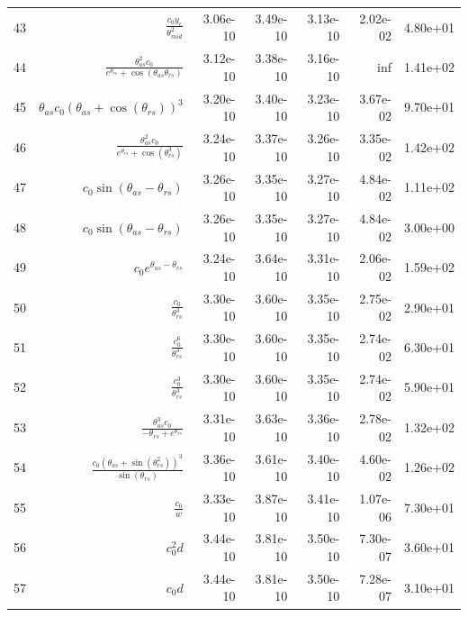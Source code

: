 \begin{tabularx}{\textwidth}{lRRRRRl}
43  &  $ \displaystyle\frac{c_{0} y_c}{\theta_{mid}^{2}} $  &  3.06e-10  &  3.49e-10  &  3.13e-10  &  2.02e-02  &  4.80e+01  \\ 
44  &  $ \displaystyle\frac{\theta_{as}^{2} c_{0}}{e^{\theta_{rs}} + \cos{\left(\theta_{as} \theta_{rs} \right)}} $  &  3.12e-10  &  3.38e-10  &  3.16e-10  &  inf  &  1.41e+02  \\ 
45  &  $ \theta_{as} c_{0} \left(\theta_{as} + \cos{\left(\theta_{rs} \right)}\right)^{3} $  &  3.20e-10  &  3.40e-10  &  3.23e-10  &  3.67e-02  &  9.70e+01  \\ 
46  &  $ \displaystyle\frac{\theta_{as}^{2} c_{0}}{e^{\theta_{rs}} + \cos{\left(\theta_{rs}^{3} \right)}} $  &  3.24e-10  &  3.37e-10  &  3.26e-10  &  3.35e-02  &  1.42e+02  \\ 
47  &  $ c_{0} \sin{\left(\theta_{as} - \theta_{rs} \right)} $  &  3.26e-10  &  3.35e-10  &  3.27e-10  &  4.84e-02  &  1.11e+02  \\ 
48  &  $ c_{0} \sin{\left(\theta_{as} - \theta_{rs} \right)} $  &  3.26e-10  &  3.35e-10  &  3.27e-10  &  4.84e-02  &  3.00e+00  \\ 
49  &  $ c_{0} e^{\theta_{as} - \theta_{rs}} $  &  3.24e-10  &  3.64e-10  &  3.31e-10  &  2.06e-02  &  1.59e+02  \\ 
50  &  $ \displaystyle\frac{c_{0}}{\theta_{rs}^{3}} $  &  3.30e-10  &  3.60e-10  &  3.35e-10  &  2.75e-02  &  2.90e+01  \\ 
51  &  $ \displaystyle\frac{c_{0}^{6}}{\theta_{rs}^{3}} $  &  3.30e-10  &  3.60e-10  &  3.35e-10  &  2.74e-02  &  6.30e+01  \\ 
52  &  $ \displaystyle\frac{c_{0}^{3}}{\theta_{rs}^{3}} $  &  3.30e-10  &  3.60e-10  &  3.35e-10  &  2.74e-02  &  5.90e+01  \\ 
53  &  $ \displaystyle\frac{\theta_{as}^{3} c_{0}}{- \theta_{rs} + e^{\theta_{rs}}} $  &  3.31e-10  &  3.63e-10  &  3.36e-10  &  2.78e-02  &  1.32e+02  \\ 
54  &  $ \displaystyle\frac{c_{0} \left(\theta_{as} + \sin{\left(\theta_{rs}^{2} \right)}\right)^{3}}{\sin{\left(\theta_{rs} \right)}} $  &  3.36e-10  &  3.61e-10  &  3.40e-10  &  4.60e-02  &  1.26e+02  \\ 
55  &  $ \displaystyle\frac{c_{0}}{w} $  &  3.33e-10  &  3.87e-10  &  3.41e-10  &  1.07e-06  &  7.30e+01  \\ 
56  &  $ c_{0}^{2} d $  &  3.44e-10  &  3.81e-10  &  3.50e-10  &  7.30e-07  &  3.60e+01  \\ 
57  &  $ c_{0} d $  &  3.44e-10  &  3.81e-10  &  3.50e-10  &  7.28e-07  &  3.10e+01  \\ 

\end{tabularx}
